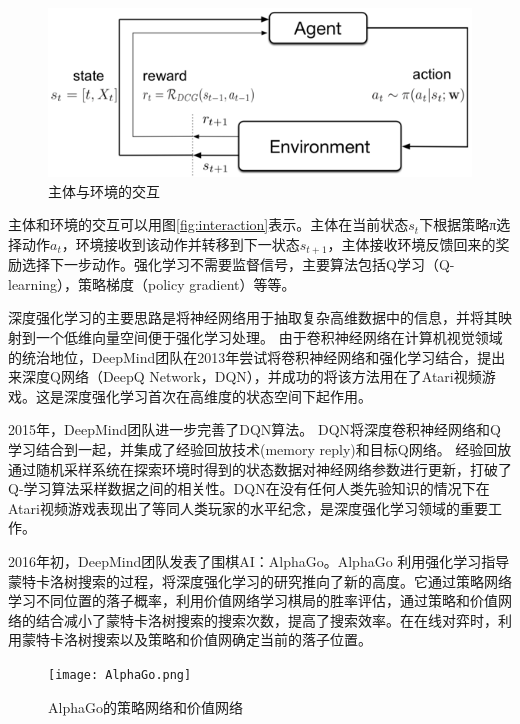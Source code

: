 \begin{figure}[!htbp]
\vspace{1em}
\centering
  \includegraphics[width=0.8\linewidth]{figures/interaction.png}
  \caption{主体与环境的交互}
  \label{fig:LSTM-DSSM}       %
\vspace{1em}
\end{figure}

主体和环境的交互可以用图\ref{fig:interaction}表示。主体在当前状态$s_t$下根据策略π选择动作$a_t$，环境接收到该动作并转移到下一状态$s_{t+1}$，主体接收环境反馈回来的奖励选择下一步动作。强化学习不需要监督信号，主要算法包括Q学习（Q-learning），策略梯度（policy gradient）等等。

深度强化学习的主要思路是将神经网络用于抽取复杂高维数据中的信息，并将其映射到一个低维向量空间便于强化学习处理。
由于卷积神经网络在计算机视觉领域的统治地位，DeepMind团队在2013年尝试将卷积神经网络和强化学习结合，提出来深度Q网络（DeepQ Network，DQN）\cite{Mnih2013PlayingAW}，并成功的将该方法用在了Atari视频游戏。这是深度强化学习首次在高维度的状态空间下起作用。

2015年，DeepMind团队进一步完善了DQN算法\cite{Mnih2015HumanlevelCT}。
DQN将深度卷积神经网络和Q学习结合到一起，并集成了经验回放技术(memory reply)和目标Q网络。
经验回放通过随机采样系统在探索环境时得到的状态数据对神经网络参数进行更新，打破了Q-学习算法采样数据之间的相关性。DQN在没有任何人类先验知识的情况下在Atari视频游戏表现出了等同人类玩家的水平纪念，是深度强化学习领域的重要工作。

2016年初，DeepMind团队发表了围棋AI：AlphaGo\cite{Silver2016MasteringTG}。AlphaGo 利用强化学习指导蒙特卡洛树搜索的过程，将深度强化学习的研究推向了新的高度。它通过策略网络学习不同位置的落子概率，利用价值网络学习棋局的胜率评估，通过策略和价值网络的结合减小了蒙特卡洛树搜索的搜索次数，提高了搜索效率。在在线对弈时，利用蒙特卡洛树搜索以及策略和价值网确定当前的落子位置。

\begin{figure}[!htbp]\centering
\vspace{1em}
  \texttt{[image: AlphaGo.png]}
  \caption{AlphaGo的策略网络和价值网络}  \label{fig:AlphaGo}       %
\vspace{1em}
\end{figure}

